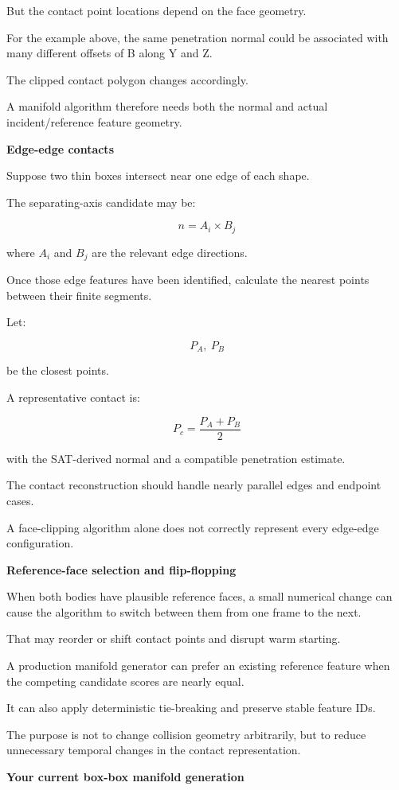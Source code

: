 But the contact point locations depend on the face geometry.

For the example above, the same penetration normal could be associated with many different offsets of B along Y and Z.

The clipped contact polygon changes accordingly.

A manifold algorithm therefore needs both the normal and actual incident/reference feature geometry.

\textbf{Edge-edge contacts}

Suppose two thin boxes intersect near one edge of each shape.

The separating-axis candidate may be:

\[
n=A_i\times B_j
\]

where \(A_i\) and \(B_j\) are the relevant edge directions.

Once those edge features have been identified, calculate the nearest points between their finite segments.

Let:

\[
P_A,\ P_B
\]

be the closest points.

A representative contact is:

\[
P_c=\frac{P_A+P_B}{2}
\]

with the SAT-derived normal and a compatible penetration estimate.

The contact reconstruction should handle nearly parallel edges and endpoint cases.

A face-clipping algorithm alone does not correctly represent every edge-edge configuration.

\textbf{Reference-face selection and flip-flopping}

When both bodies have plausible reference faces, a small numerical change can cause the algorithm to switch between them from one frame to the next.

That may reorder or shift contact points and disrupt warm starting.

A production manifold generator can prefer an existing reference feature when the competing candidate scores are nearly equal.

It can also apply deterministic tie-breaking and preserve stable feature IDs.

The purpose is not to change collision geometry arbitrarily, but to reduce unnecessary temporal changes in the contact representation.

\textbf{Your current box-box manifold generation}

